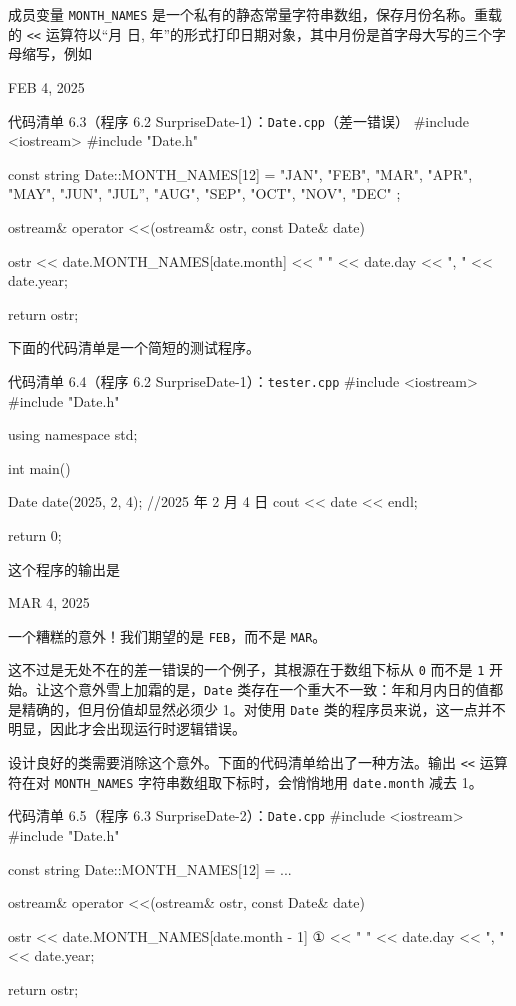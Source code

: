 成员变量 \texttt{MONTH\_\allowbreak{}NAMES} 是一个私有的静态常量字符串数组，保存月份名称。重载的 \texttt{<<} 运算符以“月 日, 年”的形式打印日期对象，其中月份是首字母大写的三个字母缩写，例如

\begin{codebox}
FEB 4, 2025 
\end{codebox}

\begin{codeboxt}{代码清单 6.3（程序 6.2 SurpriseDate-1）：\texttt{Date.cpp}（差一错误）}
#include <iostream>
#include "Date.h"

const string Date::MONTH_NAMES[12] =
{
    "JAN", "FEB", "MAR", "APR", "MAY", "JUN",
    "JUL”, "AUG", "SEP", "OCT", "NOV", "DEC"
};

ostream& operator <<(ostream& ostr, const Date& date)
{
    ostr << date.MONTH_NAMES[date.month]
         << " " << date.day << ", " << date.year;

    return ostr;
}
\end{codeboxt}

下面的代码清单是一个简短的测试程序。

\begin{codeboxt}{代码清单 6.4（程序 6.2 SurpriseDate-1）：\texttt{tester.\allowbreak{}cpp}}
#include <iostream>
#include "Date.h"

using namespace std;

int main()
{
    Date date(2025, 2, 4);  //2025 年 2 月 4 日
    cout << date << endl;

    return 0;
}
\end{codeboxt}

这个程序的输出是

\begin{codebox}
MAR 4, 2025
\end{codebox}

一个糟糕的意外！我们期望的是 \texttt{FEB}，而不是 \texttt{MAR}。

这不过是无处不在的差一错误的一个例子，其根源在于数组下标从 \texttt{0} 而不是 \texttt{1} 开始。让这个意外雪上加霜的是，\texttt{Date} 类存在一个重大不一致：年和月内日的值都是精确的，但月份值却显然必须少 1。对使用 \texttt{Date} 类的程序员来说，这一点并不明显，因此才会出现运行时逻辑错误。

设计良好的类需要消除这个意外。下面的代码清单给出了一种方法。输出 \texttt{<<} 运算符在对 \texttt{MONTH\_\allowbreak{}NAMES} 字符串数组取下标时，会悄悄地用 \texttt{date.\allowbreak{}month} 减去 1。

\begin{codeboxt}{代码清单 6.5（程序 6.3 SurpriseDate-2）：\texttt{Date.cpp}}
#include <iostream>
#include "Date.h"

const string Date::MONTH_NAMES[12] = ...

ostream& operator <<(ostream& ostr, const Date& date)
{
    ostr << date.MONTH_NAMES[date.month - 1]         ①
         << " " << date.day << ", " << date.year;

    return ostr;
}
\end{codeboxt}
\par

